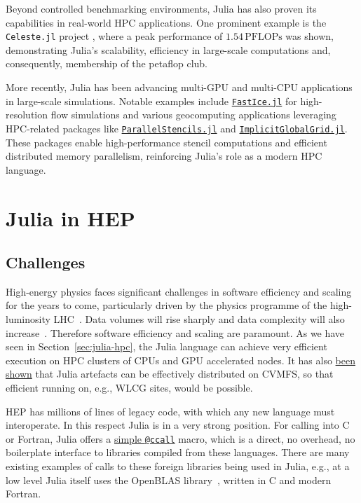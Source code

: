 \documentclass{webofc}
\begin{document}
Beyond controlled benchmarking environments, Julia has also proven its
capabilities in real-world HPC applications. One prominent example is the
\texttt{Celeste.jl} project \cite{RiegerIEEE:2018,RiegerAAS:2019}, where a peak
performance of \(1.54\,\mathrm{PFLOPs}\) was shown, demonstrating Julia's
scalability, efficiency in large-scale computations and, consequently,
membership of the petaflop club.

More recently, Julia has been advancing multi-GPU and multi-CPU applications in
large-scale simulations. Notable examples include
\href{https://github.com/PTsolvers/FastIce.jl}{\texttt{FastIce.jl}} for
high-resolution flow simulations and various geocomputing applications
leveraging HPC-related packages like
\href{https://github.com/omlins/ParallelStencil.jl}{\texttt{ParallelStencils.jl}}
and
\href{https://github.com/eth-cscs/ImplicitGlobalGrid.jl}{\texttt{ImplicitGlobalGrid.jl}}.
These packages enable high-performance stencil computations and efficient
distributed memory parallelism, reinforcing Julia’s role as a modern HPC
language.

\section{Julia in HEP}

\subsection{Challenges}

High-energy physics faces significant challenges in software efficiency and
scaling for the years to come, particularly driven by the physics programme of
the high-luminosity LHC~\cite{hsfcwp}. Data volumes will rise sharply and data
complexity will also
increase~\cite{CERN-LHCC-2022-005,Software:2815292,Valassi2021}. Therefore
software efficiency and scaling are paramount. As we have seen in
Section~\ref{sec:julia-hpc}, the Julia language can achieve very efficient
execution on HPC clusters of CPUs and GPU accelerated nodes. It has also
\href{https://indico.cern.ch/event/1410341/contributions/6135602/}{been shown}
that Julia artefacts can be effectively distributed on CVMFS, so that efficient
running on, e.g., WLCG sites, would be possible.

HEP has millions of lines of legacy code, with which any new language must
interoperate. In this respect Julia is in a very strong position. For calling
into C or Fortran, Julia offers a
\href{https://docs.julialang.org/en/v1/manual/calling-c-and-fortran-code/}{simple
\texttt{@ccall}} macro, which is a direct, no overhead, no boilerplate interface
to libraries compiled from these languages. There are many existing examples of
calls to these foreign libraries being used in Julia, e.g., at a low level Julia
itself uses the OpenBLAS library~\cite{6877458}, written in C and modern
Fortran. 
\end{document}
